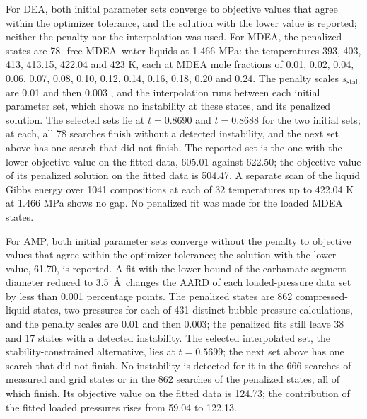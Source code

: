 For DEA, both initial parameter sets converge to objective values that agree within the optimizer tolerance, and the solution with the lower value is reported; neither the penalty nor the interpolation was used.
For MDEA, the penalized states are 78 \COtwo-free MDEA--water liquids at 1.466 MPa: the temperatures 393, 403, 413, 413.15, 422.04 and 423 K, each at MDEA mole fractions of 0.01, 0.02, 0.04, 0.06, 0.07, 0.08, 0.10, 0.12, 0.14, 0.16, 0.18, 0.20 and 0.24.
The penalty scales $s_{\mathrm{stab}}$ are 0.01 and then 0.003 \cite[Eq.~30]{PolleyPartI}, and the interpolation runs between each initial parameter set, which shows no instability at these states, and its penalized solution.
The selected sets lie at $t=0.8690$ and $t=0.8688$ for the two initial sets; at each, all 78 searches finish without a detected instability, and the next set above has one search that did not finish.
The reported set is the one with the lower objective value on the fitted data, 605.01 against 622.50; the objective value of its penalized solution on the fitted data is 504.47.
A separate scan of the liquid Gibbs energy over 1041 compositions at each of 32 temperatures up to 422.04 K at 1.466 MPa shows no gap.
No penalized fit was made for the loaded MDEA states.

For AMP, both initial parameter sets converge without the penalty to objective values that agree within the optimizer tolerance; the solution with the lower value, 61.70, is reported.
A fit with the lower bound of the carbamate segment diameter reduced to 3.5~\AA\ changes the AARD of each loaded-pressure data set by less than 0.001 percentage points.
The penalized states are 862 compressed-liquid states, two pressures for each of 431 distinct bubble-pressure calculations, and the penalty scales are 0.01 and then 0.003; the penalized fits still leave 38 and 17 states with a detected instability.
The selected interpolated set, the stability-constrained alternative, lies at $t=0.5699$; the next set above has one search that did not finish.
No instability is detected for it in the 666 searches of measured and grid states or in the 862 searches of the penalized states, all of which finish.
Its objective value on the fitted data is 124.73; the contribution of the fitted loaded pressures rises from 59.04 to 122.13.

